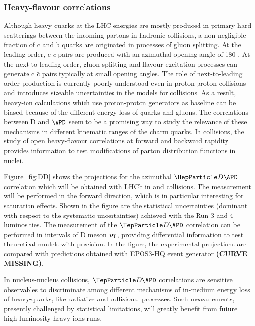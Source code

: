 \subsubsection{Heavy-flavour correlations}
Although heavy quarks at the LHC energies are mostly produced in primary hard scatterings between the incoming partons in hadronic collisions, a non negligible fraction of c and b quarks are originated in processes of gluon splitting. At the leading order, c $\bar c$ pairs are produced with an azimuthal opening angle of 180$^\circ$. At the next to leading order, gluon splitting and flavour excitation processes can generate c $\bar c$ pairs typically at small opening angles. The role of next-to-leading order production is currently poorly understood even in proton-proton collisions \cite{LHCb-PAPER-2012-003,LorentzpaperHF} and introduces sizeable uncertainties in the models for \PbPb collisions. As a result, heavy-ion calculations which use proton-proton generators as baseline can be biased because of the different energy loss of quarks and gluons. The correlations between D and $\APD$ seem to be a promising way to study the relevance of these mechanisms in different kinematic ranges of the charm quarks. In \pPb collisions, the study of open heavy-flavour correlations at forward and backward rapidity provides information to test modifications of parton distribution functions in nuclei. 

Figure~\ref{fig:DD} shows the projections for the azimuthal ${\PD \APD}$ correlation which will be obtained with LHCb in \pp and \pPb collisions. The measurement will be performed in the forward direction, which is in particular interesting for saturation effects. Shown in the figure are the statistical uncertainties (dominant with respect to the systematic uncertainties) achieved with the Run 3 and 4 luminosities. The measurement of the $\PD \APD$ correlation can be performed in intervals of D meson $p\sb{\scriptstyle\mathrm{T}}$, providing differential information to test theoretical models with precision. In the figure, the experimental projections are compared with predictions obtained with EPOS3-HQ event generator \textbf{(CURVE MISSING)}. 

In nucleus-nucleus collisions, ${\PD \APD}$ correlations are sensitive observables to discriminate among different mechanisms of in-medium energy loss of heavy-quarks, like radiative and collisional processes. Such measurements, presently challenged by statistical limitations, will greatly benefit from future high-luminosity heavy-ions runs. 

